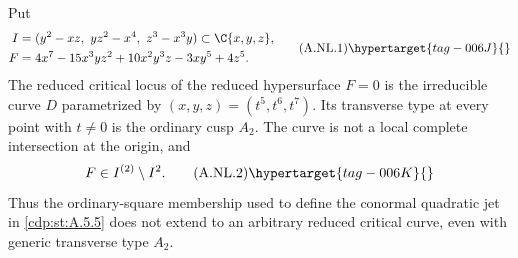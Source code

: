 \begin{proposition}\hypertarget{tag-01AK}{}\label{cdp:st:A.2.6}

Put
\[
 \begin{aligned}
 I&=(y^2-xz,\ yz^2-x^4,\ z^3-x^3y)\subset\C\{x,y,z\},\\
 F&=4x^7-15x^3yz^2+10x^2y^3z-3xy^5+4z^5.
 \end{aligned}                                                   \tag{A.NL.1}\hypertarget{tag-006J}{}\label{cdp:eq:A.NL.1}
\]
The reduced critical locus of the reduced hypersurface $F=0$ is the
irreducible curve $D$ parametrized by $(x,y,z)=(t^5,t^6,t^7)$.
Its transverse type at every point with $t\ne0$ is the ordinary cusp
$A_2$. The curve is not a local complete intersection at the origin,
and
\[
             F\in I^{(2)}\setminus I^2.                         \tag{A.NL.2}\hypertarget{tag-006K}{}\label{cdp:eq:A.NL.2}
\]
Thus the ordinary-square membership used to define the conormal
quadratic jet in \ref{cdp:st:A.5.5} does not extend to an arbitrary reduced
critical curve, even with generic transverse type $A_2$.

\end{proposition}


